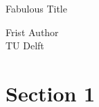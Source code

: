 \documentclass[a4paper,11pt]{article}
\theoremstyle{definition}
\begin{document}

\Large
 \begin{center}
Fabulous Title\\

\hspace{10pt}

\large
Frist Author \\
  
\small TU Delft

\end{center}

\hspace{10pt}

\normalsize


\section{Section 1}



{
\small


}
\end{document}
